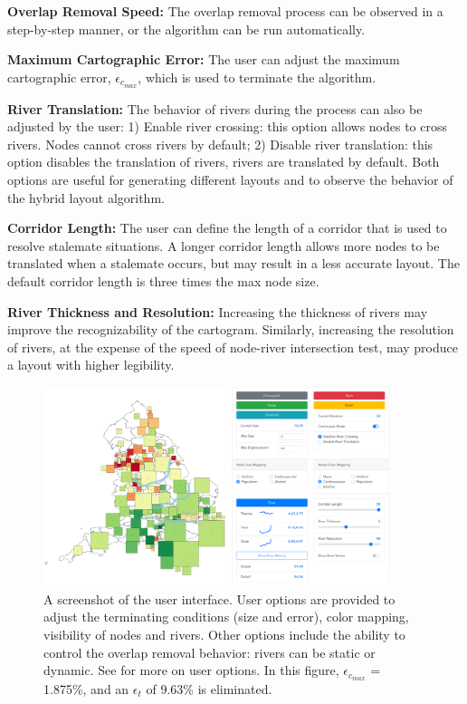 \documentclass[Afour,sagev,times]{sagej}
\newcommand{\bobgraph}[1]{\noindent\textbf{#1}}
\newcommand{\nodeError}{\epsilon}
\newcommand{\nodeCartographicErrorMax}{\nodeError_{c_{max}}}
\newcommand{\nodeTopologicalError}{\nodeError_{t}}
\begin{document}
\bobgraph{Overlap Removal Speed:} The overlap removal process can be observed in a step-by-step manner, or the algorithm can be run automatically.

\bobgraph{Maximum Cartographic Error:} The user can adjust the maximum cartographic error, $ \nodeCartographicErrorMax $, which is used to terminate the algorithm.

\bobgraph{River Translation:} The behavior of rivers during the process can also be adjusted by the user: 1) Enable river crossing: this option allows nodes to cross rivers.
Nodes cannot cross rivers by default; 2) Disable river translation: this option disables the translation of rivers, rivers are translated by default.
Both options are useful for generating different layouts and to observe the behavior of the hybrid layout algorithm.

\bobgraph{Corridor Length:} The user can define the length of a corridor that is used to resolve stalemate situations.
A longer corridor length allows more nodes to be translated when a stalemate occurs, but may result in a less accurate layout.
The default corridor length is three times the max node size.

\bobgraph{River Thickness and Resolution:} Increasing the thickness of rivers may improve the recognizability of the cartogram.
Similarly, increasing the resolution of rivers, at the expense of the speed of node-river intersection test, may produce a layout with higher legibility.

    {
        \begin{figure}[tb!]
            \centering
            \includegraphics[width=0.9\textwidth,keepaspectratio]{UI.png}
            \caption{A screenshot of the user interface.
            User options are provided to adjust the terminating conditions (size and error), color mapping, visibility of nodes and rivers.
            Other options include the ability to control the overlap removal behavior: rivers can be static or dynamic.
            See  for more on user options.
            In this figure, $ \nodeCartographicErrorMax $ = 1.875\%, and an $ \nodeTopologicalError $ of 9.63\% is eliminated.}
            \label{fig:overview}
        \end{figure}
    }
\end{document}
